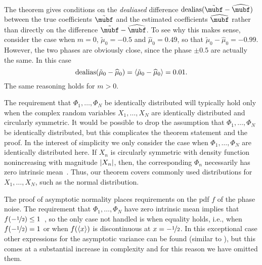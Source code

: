 \documentclass[journal]{IEEEtran}
\begin{document}
The theorem gives conditions on the \emph{dealiased} difference $\dealias(\tilde{\mubf} - \widehat{\mubf})$ between the true coefficients $\tilde{\mubf}$ and the estimated coefficients $\widehat{\mubf}$ rather than directly on the difference $\tilde{\mubf} - \widehat{\mubf}$.   To see why this makes sense, consider the case when $m=0$, $\tilde{\mu}_0 = -0.5$ and $\widehat{\mu}_0 = 0.49$, so that $\tilde{\mu}_0 - \widehat{\mu}_0 = -0.99$.  However, the two phases are obviously close, since the phase $\pm 0.5$ are actually the same.  In this case 
\[
\operatorname{dealias}(\tilde{\mu}_0 - \widehat{\mu}_0) = \left\langle \tilde{\mu}_0 - \widehat{\mu}_0 \right\rangle = 0.01.
\] 
The same reasoning holds for $m > 0$.

The requirement that $\Phi_1, \dots, \Phi_N$ be identically distributed will typically hold only when the complex random variables $X_1, \dots, X_N$ are identically distributed and circularly symmetric.  It would be possible to drop the assumption that $\Phi_1, \dots, \Phi_N$ be identically distributed, but this complicates the theorem statement and the proof.  In the interest of simplicity we only consider the case when $\Phi_1, \dots, \Phi_N$ are identically distributed here.  If $X_n$ is circularly symmetric with density function nonincreasing with magnitude $\left\vert X_n \right\vert$, then, the corresponding $\Phi_n$ necessarily has zero intrinsic mean~\cite[Theorem 5.2, page 78]{McKilliam2010thesis}.  Thus, our theorem covers commonly used distributions for $X_1, \dots, X_N$, such as the normal distribution.

The proof of asymptotic normality places requirements on the pdf $f$ of the phase noise.  The requirement that $\Phi_1, \dots, \Phi_N$ have zero intrinsic mean implies that $f(-\nicefrac{1}{2}) \leq 1$~\cite[Lemma~1]{McKilliam_mean_dir_est_sq_arc_length2010}, so the only case not handled is when equality holds, i.e., when $f(-\nicefrac{1}{2}) = 1$ or when $f(\left\langle x \right\rangle)$ is discontinuous at $x = -\nicefrac{1}{2}$. In this exceptional case other expressions for the asymptotic variance can be found (similar to \cite[Theorem 3.1]{Hotz_circle_means_2011}), but this comes at a substantial increase in complexity and for this reason we have omitted them. %

\end{document}
